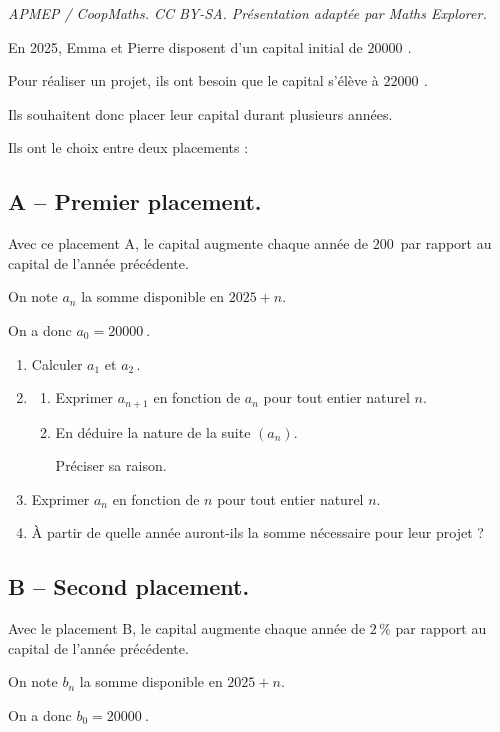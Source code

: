 \documentclass[10pt]{article}
\providecommand{\euro}{\texteuro}
\providecommand{\np}[2][]{{#2~#1}}
\providecommand{\euro}{{\text{€}}}
\renewcommand{\euro}{\ifmmode\text{\texteuro}\else\texteuro\fi}
\begin{document}
\noindent\textit{APMEP / CoopMaths. CC BY-SA. Présentation adaptée par Maths Explorer.}\par\medskip
En 2025, Emma et Pierre disposent d'un capital initial de $\np{20000} $\,\euro{}.

	Pour réaliser un projet, ils ont besoin que le capital s'élève à $\np{22000} $\,\euro{}.

	Ils souhaitent donc placer leur capital durant plusieurs années.

	Ils ont le choix entre deux placements :

	\subsection*{A -- Premier placement.}
	Avec ce placement A, le capital augmente chaque année de $200 $\,\euro{} par rapport au capital de l'année précédente.

	On note $a_{n}$ la somme disponible en $2025+n$.

	On a donc $a_{0}=\np{20000}$.

	\begin{enumerate}
		\item Calculer $a_{1}$ et $a_{2}$\,.
		\item \begin{enumerate}
			\item Exprimer $a_{n+1}$ en fonction de $a_{n}$ pour tout entier naturel $n$.

			\item En déduire la nature de la suite $\left(a_{n}\right)$.

			Préciser sa raison.
		\end{enumerate}

		\item Exprimer $a_{n}$ en fonction de $n$ pour tout entier naturel $n$.

		\item À partir de quelle année auront-ils la somme nécessaire pour leur projet ?
	\end{enumerate}

	\subsection*{B -- Second placement.}
	Avec le placement B, le capital augmente chaque année de $2\,\%$ par rapport au capital de l'année précédente.

	On note $b_{n}$ la somme disponible en $2025+n$.

	On a donc $b_{0}=\np{20000}$.
\end{document}
